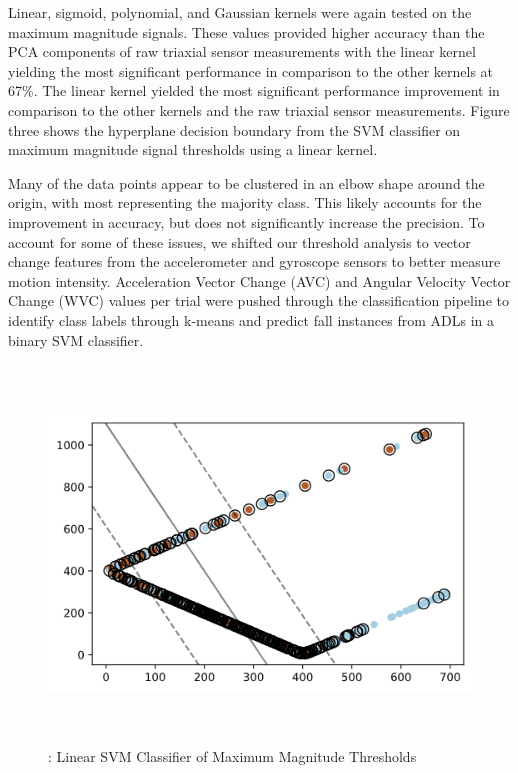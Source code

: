 \documentclass{llncs}
\begin{document}
	Linear, sigmoid, polynomial, and Gaussian kernels were again tested on the maximum magnitude signals. These values provided higher accuracy than the PCA components of raw triaxial sensor measurements with the linear kernel yielding the most significant performance in comparison to the other kernels at 67\%. The linear kernel yielded the most significant performance improvement in comparison to the other kernels and the raw triaxial sensor measurements. Figure three shows the hyperplane decision boundary from the SVM classifier on maximum magnitude signal thresholds using a linear kernel.

	Many of the data points appear to be clustered in an elbow shape around the origin, with most representing the majority class. This likely accounts for the improvement in accuracy, but does not significantly increase the precision. To account for some of these issues, we shifted our threshold analysis to vector change features from the accelerometer and gyroscope sensors to better measure motion intensity. Acceleration Vector Change (AVC) and Angular Velocity Vector Change (WVC) values per trial were pushed through the classification pipeline to identify class labels through k-means and predict fall instances from ADLs in a binary SVM classifier.
	

\begin{figure}
	\centering
	\includegraphics[width=12cm, height=10cm]{images/Classification/linear_classifier_boundary.png} 
	\caption{: Linear SVM Classifier of Maximum Magnitude Thresholds}
	\label{Figure 3: Decision Boundary of Linear Kernel SVM with Magnitude Thresholds}
\end{figure} 
    
\end{document}
